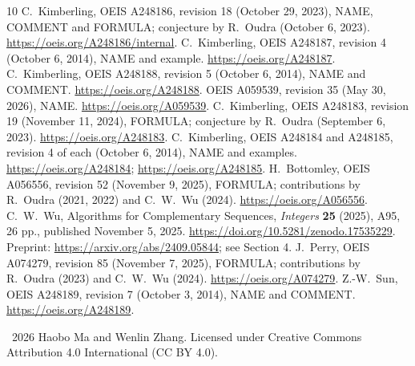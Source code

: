 \documentclass[11pt]{article}
\begin{document}
\begin{thebibliography}{10}
 C.~Kimberling, OEIS A248186, revision 18
(October 29, 2023), NAME, COMMENT and FORMULA; conjecture by
R.~Oudra (October 6, 2023).
\url{https://oeis.org/A248186/internal}.
 C.~Kimberling, OEIS A248187, revision 4
(October 6, 2014), NAME and example. \url{https://oeis.org/A248187}.
 C.~Kimberling, OEIS A248188, revision 5
(October 6, 2014), NAME and COMMENT. \url{https://oeis.org/A248188}.
 OEIS A059539, revision 35 (May 30, 2026), NAME.
\url{https://oeis.org/A059539}.
 C.~Kimberling, OEIS A248183, revision 19
(November 11, 2024), FORMULA; conjecture by R.~Oudra
(September 6, 2023). \url{https://oeis.org/A248183}.
 C.~Kimberling, OEIS A248184 and A248185,
revision 4 of each (October 6, 2014), NAME and examples.
\url{https://oeis.org/A248184}; \url{https://oeis.org/A248185}.
 H.~Bottomley, OEIS A056556, revision 52
(November 9, 2025), FORMULA; contributions by R.~Oudra
(2021, 2022) and C.~W.~Wu (2024). \url{https://oeis.org/A056556}.
 C.~W.~Wu, Algorithms for Complementary Sequences,
\emph{Integers} \textbf{25} (2025), A95, 26 pp., published November 5, 2025.
\url{https://doi.org/10.5281/zenodo.17535229}.
Preprint: \url{https://arxiv.org/abs/2409.05844}; see Section 4.
 J.~Perry, OEIS A074279, revision 85
(November 7, 2025), FORMULA; contributions by R.~Oudra (2023)
and C.~W.~Wu (2024). \url{https://oeis.org/A074279}.
 Z.-W.~Sun, OEIS A248189, revision 7
(October 3, 2014), NAME and COMMENT. \url{https://oeis.org/A248189}.
\end{thebibliography}
\noindent\small\textcopyright\ 2026 Haobo Ma and Wenlin Zhang.
Licensed under Creative Commons Attribution 4.0 International (CC BY 4.0).
\end{document}
